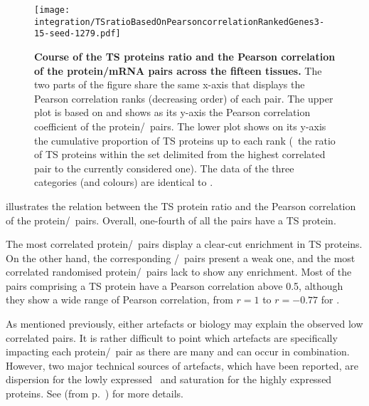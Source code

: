 \begin{figure}[!ht]
    \texttt{[image: integration/TSratioBasedOnPearsoncorrelationRankedGenes3-15-seed-1279.pdf]}\centering
    \vspace{-3mm}
    \caption[Course of the TS proteins ratio and the Pearson correlation
    of protein/mRNA pairs]{\label{fig:Spe_Cor}%
    \textbf{Course of the TS proteins ratio and the Pearson correlation
    of the protein/mRNA pairs across the fifteen tissues.}
    The two parts of the figure share the same x-axis
    that displays the Pearson correlation ranks (decreasing order) of each pair.
    The upper plot is based on 
    and shows as its y-axis the Pearson correlation coefficient
    of the protein/\mRNA\ pairs.
    The lower plot shows on its y-axis
    the cumulative proportion of \gls{TS} proteins up to each rank
    (\ie\ the ratio of \gls{TS} proteins
    within the set delimited from the highest correlated pair
    to the currently considered one).
    The data of the three categories (and colours)
    are identical to .}
\end{figure}

\vspace{-1mm}
 illustrates the relation between the \gls{TS} protein ratio
and the Pearson correlation of the protein/\mRNA\ pairs.
Overall, one-fourth of all the pairs have a \gls{TS} protein.

The most correlated protein/\mRNA\ pairs display
a clear-cut enrichment in \gls{TS} proteins.
On the other hand, the corresponding \mRNA/\mRNA\ pairs present a weak one,
and the most correlated randomised protein/\mRNA\ pairs
lack to show any enrichment.
Most of the pairs comprising a \gls{TS} protein have
a Pearson correlation above 0.5,
although they show a wide range of Pearson correlation,
from $r=1$ to $r= -0.77$ for .\\
\vspace{-\baselineskip}

As mentioned previously,
either artefacts or biology may explain the observed low correlated pairs.
It is rather difficult to point
which artefacts are specifically impacting each protein/\mRNA\ pair
as there are many and can occur in combination.
However, two major technical sources of artefacts,
which have been reported,
are dispersion for the lowly expressed \mRNAs\ and
saturation for the highly expressed proteins.
See  (from p.~\pageref{sec:transExplo})
for more details.
\vspace{-2mm}

